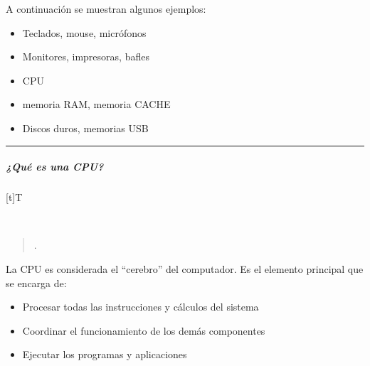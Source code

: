 \documentclass[letterpaper,10pt,spanish]{sphinxmanual}
\let\sphinxpxdimen\pdfpxdimen\else\newdimen\sphinxpxdimen
\begin{document}
\sphinxAtStartPar
A continuación se muestran algunos ejemplos:
\begin{itemize}
\item {} 
\sphinxAtStartPar
{} Teclados, mouse, micrófonos

\item {} 
\sphinxAtStartPar
{} Monitores, impresoras, bafles

\item {} 
\sphinxAtStartPar
{} CPU

\item {} 
\sphinxAtStartPar
{} memoria RAM, memoria CACHE

\item {} 
\sphinxAtStartPar
{} Discos duros, memorias USB

\end{itemize}


\bigskip\hrule\bigskip



\subparagraph{¿Qué es una CPU?}
\label{\detokenize{cursos/logica8/recursos/T01:que-es-una-cpu}}

\begin{savenotes}\sphinxattablestart
\sphinxthistablewithglobalstyle
\centering
\begin{tabulary}{\linewidth}[t]{T}
\sphinxtoprule
\sphinxtableatstartofbodyhook

\begin{sphinxfigure-in-table}
\centering
\capstart
\noindent\sphinxincludegraphics[width=300\sphinxpxdimen]{{image012}.png}
\label{\detokenize{cursos/logica8/recursos/T01:id13}}\end{sphinxfigure-in-table}\relax
\\
\sphinxbottomrule
\end{tabulary}
\sphinxtableafterendhook\par
\sphinxattableend\end{savenotes}
\begin{quote}

\sphinxAtStartPar
{}.
\end{quote}

\sphinxAtStartPar
\sphinxfootnotemark[1] La CPU es considerada el “cerebro” del computador. Es el elemento principal que se encarga de:
\begin{itemize}
\item {} 
\sphinxAtStartPar
Procesar todas las instrucciones y cálculos del sistema

\item {} 
\sphinxAtStartPar
Coordinar el funcionamiento de los demás componentes

\item {} 
\sphinxAtStartPar
Ejecutar los programas y aplicaciones

\end{itemize}
\end{document}
